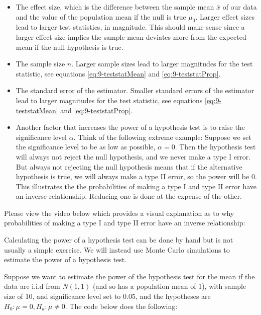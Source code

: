 \documentclass[
]{book}
\begin{document}
\begin{itemize}
\item
  The effect size, which is the difference between the sample mean \(\bar{x}\) of our data and the value of the population mean if the null is true \(\mu_0\). Larger effect sizes lead to larger test statistics, in magnitude. This should make sense since a larger effect size implies the sample mean deviates more from the expected mean if the null hypothesis is true.
\item
  The sample size \(n\). Larger sample sizes lead to larger magnitudes for the test statistic, see equations \eqref{eq:9-teststatMean} and \eqref{eq:9-teststatProp}.
\item
  The standard error of the estimator. Smaller standard errors of the estimator lead to larger magnitudes for the test statistic, see equations \eqref{eq:9-teststatMean} and \eqref{eq:9-teststatProp}.
\item
  Another factor that increases the power of a hypothesis test is to raise the significance level \(\alpha\). Think of the following extreme example: Suppose we set the significance level to be as low as possible, \(\alpha=0\). Then the hypothesis test will always not reject the null hypothesis, and we never make a type I error. But always not rejecting the null hypothesis means that if the alternative hypothesis is true, we will always make a type II error, so the power will be 0. This illustrates the the probabilities of making a type I and type II error have an inverse relationship. Reducing one is done at the expense of the other.
\end{itemize}

Please view the video below which provides a visual explanation as to why probabilities of making a type I and type II error have an inverse relationship:

Calculating the power of a hypothesis test can be done by hand but is not usually a simple exercise. We will instead use Monte Carlo simulations to estimate the power of a hypothesis test.

Suppose we want to estimate the power of the hypothesis test for the mean if the data are i.i.d from \(N(1,1)\) (and so has a population mean of 1), with sample size of 10, and significance level set to 0.05, and the hypotheses are \(H_0: \mu = 0, H_a: \mu \neq 0\). The code below does the following:
\end{document}
